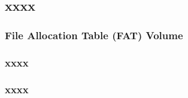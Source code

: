 \subsection{xxxx} %
\begin{frame}[fragile]
    \frametitle{File Allocation Table (FAT) Volume}
\end{frame}
% 
% 
% 
% 
\begin{frame}[fragile]
    \frametitle{xxxx}
\end{frame}
% 
% 
% 
\begin{frame}[fragile]
    \frametitle{xxxx}
\end{frame}
% 
% 
% 
